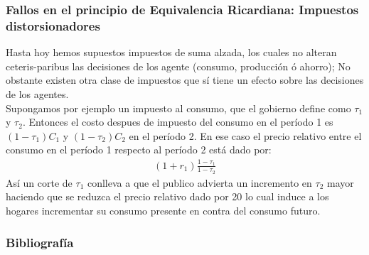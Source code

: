 \documentclass[10pt, xcolor=table, x11names]{beamer}
\begin{document}
\begin{frame}[label=20]
	\frametitle{{\normalsize Fallos en el principio de Equivalencia Ricardiana: Impuestos distorsionadores} {}}
	Hasta hoy hemos supuestos impuestos de suma alzada, los cuales no alteran ceteris-paribus las decisiones de los agente (consumo, producción ó ahorro);  No obstante existen otra clase de impuestos que sí tiene un efecto sobre las decisiones de los agentes. \\
	Supongamos por ejemplo un impuesto al consumo, que el gobierno define como $\tau_{1} $ y $\tau_{2} $. Entonces el costo despues de impuesto del consumo en el período 1 es $(1-\tau_{1} )C_{1}$ y $(1-\tau_{2} )C_{2}$ en el período 2. En ese caso el precio relativo entre el consumo en el período 1 respecto al período 2 está dado por:
	 \begin{align}
	 (1+r_{1})\frac{1-\tau_{1}}{1-\tau_{2}}
	 \end{align}  
	 Así un corte de $\tau_{1} $ conlleva a que el publico advierta un incremento en  $\tau_{2} $ mayor haciendo que se reduzca el precio relativo dado por 20 lo cual induce a los hogares incrementar su consumo presente en contra del consumo futuro.
 \end{frame}




	\begin{frame}
		\frametitle{{\large 
				Bibliografía}}
		\renewcommand{\refname}{Referencias}
		
		
	\end{frame}
\end{document}
